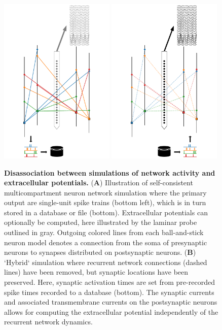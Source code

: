 \begin{figure}[!ht]
\begin{center}
\includegraphics[width=0.49\textwidth]{Figures/Ch-LFPy/Ch-LFPy-hybrid_A.pdf}
\includegraphics[width=0.49\textwidth]{Figures/Ch-LFPy/Ch-LFPy-hybrid_B.pdf}
\end{center}
\caption{\textbf{Disassociation between simulations of network activity and extracellular potentials.}
({\bf A}) Illustration of self-consistent multicompartment neuron network simulation where the primary output are single-unit spike trains (bottom left),
which is in turn stored in a database or file (bottom).
Extracellular potentials can optionally be computed,
here illustrated by the laminar probe outlined in gray.
Outgoing colored lines from each ball-and-stick neuron model denotes a connection from the soma of presynaptic neurons to synapses distributed on postsynaptic neurons.
({\bf B}) `Hybrid` simulation where recurrent network connections (dashed lines) have been removed,
but synaptic locations have been preserved.
Here, synaptic activation times are set from pre-recorded spike times recorded to a database (bottom).
The synaptic currents and associated transmembrane currents on the postsynaptic neurons allows for computing the extracellular potential independently of the recurrent network dynamics.
}
\label{fig:LFPy_hybrid}
\end{figure}


